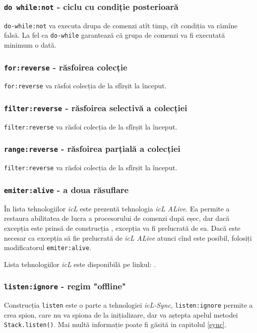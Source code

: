 \subsubsection{\lstinline|do while:not| - ciclu cu condiție posterioară}

\lstinline|do-while:not| va executa drupa de comenzi atît timp, cît condiția va rămîne falsă. La fel ca \lstinline|do-while| garantează că grupa de comenzi va fi executată minimum o dată.

\subsubsection{\lstinline|for:reverse| - răsfoirea colecție}

\lstinline|for:reverse| va răsfoi colecția de la sfîrșit la început.

\subsubsection{\lstinline|filter:reverse| - răsfoirea selectivă a colecției}

\lstinline|filter:reverse| va răsfoi colecția de la sfîrșit la început.

\subsubsection{\lstinline|range:reverse| - răsfoirea parțială a colecției}

\lstinline|filter:reverse| va răsfoi colecția de la sfîrșit la început.

\subsubsection{\lstinline|emiter:alive| - a doua răsuflare}

În lista tehnologiilor \textit{icL} este prezentă tehnologia \textit{icL ALive}. Ea permite a restaura abilitatea de lucra a procesorului de comenzi după eșec, dar dacă excepția este prinsă de construcția , excepția va fi prelucrată de ea. Dacă este necesar ca excepția să fie prelucrată de \textit{icL ALive} atunci cînd este posibil, folosiți modificatorul \lstinline|emiter:alive|.

Lista tehnologiilor \textit{icL} este disponibilă pe linkul: .

\subsubsection{\lstinline|listen:ignore| - regim "offline"}

Construcția \lstinline|listen| este o parte a tehnologiei \textit{icL-Sync}, \lstinline|listen:ignore| permite a crea spion, care nu va spiona de la inițializare, dar va aștepta apelul metodei \lstinline|Stack.listen()|. Mai multă informație poate fi găsită in capitolul \ref{sync}.
